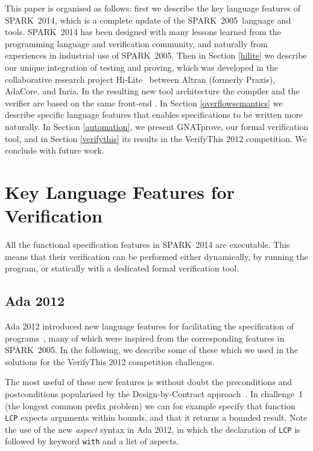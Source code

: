 \documentclass[sttt,final]{svjour}
\newcommand{\hilite}{Hi-Lite}
\newcommand{\oldspark}{SPARK~2005\xspace}
\newcommand{\newspark}{SPARK~2014\xspace}
\begin{document}
This paper is organised as follows: first we describe the key language
features of \newspark, which is a complete update of the \oldspark\
language and tools. \newspark has been designed with many lessons
learned from the programming language and verification community, and
naturally from experiences in industrial use of \oldspark. Then in
Section \ref{hilite} we describe our unique integration of testing and
proving, which was developed in the collaborative research project
\hilite\ \cite{hiliteERTS2012} between Altran (formerly Praxis),
AdaCore, and Inria. In the resulting new tool architecture the
compiler and the verifier are based on the same front-end
\cite{ksd2012}. In Section \ref{overflowsemantics} we describe
specific language features that enables specifications to be written
more naturally. In Section \ref{automation}, we present GNATprove, our
formal verification tool, and in
Section \ref{verifythis} its results in the VerifyThis 2012
competition. We conclude with future work.

\section{Key Language Features for Verification}
\label{langfeatures}

All the functional specification features in \newspark are executable. This
means that their verification can be performed either dynamically, by running
the program, or statically with a dedicated formal verification tool.

\subsection{Ada 2012}

Ada 2012 introduced new language features for facilitating the
specification of programs~\cite{ada2012rationale}, many of which were
inspired from the corresponding features in \oldspark. In the following,
we describe some of these which we used in the solutions for the
VerifyThis 2012 competition challenges.

The most useful of these new features is without doubt the
preconditions and postconditions popularised by the Design-by-Contract
approach~\cite{meyer:1988:OSC}. In challenge~1 (the longest common
prefix problem) we can for example specify that function \verb|LCP|
expects arguments within bounds, and that it returns a bounded
result. Note the use of the new \textit{aspect} syntax in Ada 2012, in
which the declaration of \verb|LCP| is followed by keyword \verb|with|
and a list of aspects.
\end{document}
